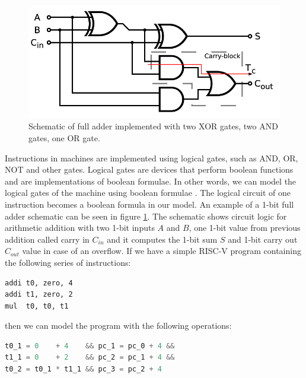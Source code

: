 \documentclass[12pt]{article}
\begin{document}

\begin{figure}
    \includegraphics[width=\linewidth]{assets/full_adder_schematic.png}
    \centering
    \caption{
        Schematic of full adder implemented with two XOR gates, two AND gates,
        one OR gate.
    }
    \label{fig:full_adder_schematic}
\end{figure}

Instructions in machines are implemented using logical gates, such as AND, OR,
NOT and other gates. Logical gates are devices that perform boolean functions 
and are implementations of boolean formulae. In other words, we can model the
logical gates of the machine using boolean formulae \cite{page2009practical}.
The logical circuit of one instruction becomes a boolean formula in our model.
An example of a 1-bit full adder schematic can be seen in figure
\ref{fig:full_adder_schematic}. The schematic shows circuit logic for
arithmetic addition with two 1-bit inputs $A$ and $B$, one 1-bit value from
previous addition called carry in $C_{in}$ and it computes the 1-bit sum $S$
and 1-bit carry out $C_{out}$ value in case of an overflow. If we have a simple
RISC-V program containing the following series of instructions:
\begin{lstlisting}[language={[RISC-V]Assembler}, label=lst:example_riscv_program]
addi t0, zero, 4
addi t1, zero, 2
mul  t0, t0, t1
\end{lstlisting}
then we can model the program with the following operations:
\begin{lstlisting}[language=C, label=lst:example_model, caption=Example model, captionpos=b]
t0_1 = 0    + 4    && pc_1 = pc_0 + 4 &&
t1_1 = 0    + 2    && pc_2 = pc_1 + 4 &&
t0_2 = t0_1 * t1_1 && pc_3 = pc_2 + 4 
\end{lstlisting}
\end{document}
